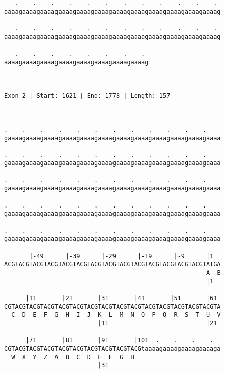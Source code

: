 \documentclass{article}
\begin{document}
\begin{Verbatim}
   .    .    .    .    .    .    .    .    .    .    .    . 
aaaagaaaagaaaagaaaagaaaagaaaagaaaagaaaagaaaagaaaagaaaagaaaag
                                                            
   .    .    .    .    .    .    .    .    .    .    .    . 
aaaagaaaagaaaagaaaagaaaagaaaagaaaagaaaagaaaagaaaagaaaagaaaag
                                                            
   .    .    .    .    .    .    .    . 
aaaagaaaagaaaagaaaagaaaagaaaagaaaagaaaag
                                        
                                        
 
Exon 2 | Start: 1621 | End: 1778 | Length: 157



.    .    .    .    .    .    .    .    .    .    .    .    
gaaaagaaaagaaaagaaaagaaaagaaaagaaaagaaaagaaaagaaaagaaaagaaaa
                                                            
.    .    .    .    .    .    .    .    .    .    .    .    
gaaaagaaaagaaaagaaaagaaaagaaaagaaaagaaaagaaaagaaaagaaaagaaaa
                                                            
.    .    .    .    .    .    .    .    .    .    .    .    
gaaaagaaaagaaaagaaaagaaaagaaaagaaaagaaaagaaaagaaaagaaaagaaaa
                                                            
.    .    .    .    .    .    .    .    .    .    .    .    
gaaaagaaaagaaaagaaaagaaaagaaaagaaaagaaaagaaaagaaaagaaaagaaaa
                                                            
.    .    .    .    .    .    .    .    .    .    .    .    
gaaaagaaaagaaaagaaaagaaaagaaaagaaaagaaaagaaaagaaaagaaaagaaaa
                                                            
       |-49      |-39      |-29      |-19      |-9      |1  
ACGTACGTACGTACGTACGTACGTACGTACGTACGTACGTACGTACGTACGTACGTATGA
                                                        A  B
                                                        |1  
  
      |11       |21       |31       |41       |51       |61 
CGTACGTACGTACGTACGTACGTACGTACGTACGTACGTACGTACGTACGTACGTACGTA
  C  D  E  F  G  H  I  J  K  L  M  N  O  P  Q  R  S  T  U  V
                          |11                           |21 
  
      |71       |81       |91       |101  .    .    .    .  
CGTACGTACGTACGTACGTACGTACGTACGTACGTACGtaaaagaaaagaaaagaaaaga
  W  X  Y  Z  A  B  C  D  E  F  G  H                        
                          |31                               
  

\end{Verbatim}
\end{document}
